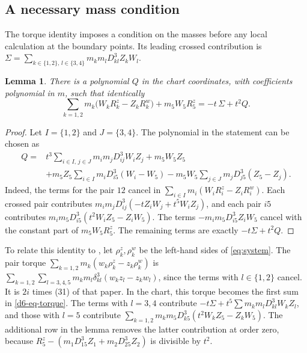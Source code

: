 \documentclass[Threeside,11pt]{article}
\newtheorem{lemma}[theorem]{Lemma}
\theoremstyle{definition}
\theoremstyle{remark}
\numberwithin{equation}{section}
\theoremstyle{remark}
\begin{document}
\subsection{A necessary mass condition}

{
The torque identity imposes a condition on the masses before any local
calculation at the boundary points.  Its leading crossed contribution is
$\Sigma=\sum_{k\in\{1,2\},\,l\in\{3,4\}}m_km_lD_{kl}^3Z_kW_l$.
}

{\begin{lemma}\label{d6-lem-torque}
There is a polynomial $Q$ in the chart coordinates, with coefficients polynomial in $m$, such
that identically
\begin{equation}\label{d6-eq-torque}
  \sum_{k=1,2}m_k\bigl(W_kR^z_k-Z_kR^w_k\bigr)+m_5W_5R^z_5=-t\,\Sigma+t^2Q.
\end{equation}
\end{lemma}}
{\begin{proof}
Let $I=\{1,2\}$ and $J=\{3,4\}$. The polynomial in the statement can be chosen as
\begin{align*}
Q={}&t^3\sum_{i\in I,\,j\in J}m_im_jD_{ij}^3W_iZ_j
 +m_5W_5Z_5\\
&+m_5Z_5\sum_{i\in I}m_iD_{i5}^3(W_i-W_5)
 -m_5W_5\sum_{j\in J}m_jD_{j5}^3(Z_5-Z_j).
\end{align*}
Indeed, the terms for the pair $12$ cancel in
$\sum_{i\in I}m_i(W_iR_i^z-Z_iR_i^w)$.
Each crossed pair contributes
$m_im_jD_{ij}^3(-tZ_iW_j+t^5W_iZ_j)$,
and each pair $i5$ contributes
$m_im_5D_{i5}^3(t^2W_iZ_5-Z_iW_5)$.
The terms $-m_im_5D_{i5}^3Z_iW_5$ cancel with the constant part of
$m_5W_5R_5^z$. The remaining terms are exactly $-t\Sigma+t^2Q$.
\end{proof}

}{
To relate this identity to \cite[\S8.6]{AK}, let $\rho^z_k,\rho^w_k$ be
the left-hand sides of \eqref{eq:system}.  The pair torque
$\sum_{k=1,2}m_k(w_k\rho^z_k-z_k\rho^w_k)$ is
$\sum_{k=1,2}\sum_{l=3,4,5}m_km_l\delta_{kl}^3(w_kz_l-z_kw_l)$,
since the terms with $l\in\{1,2\}$ cancel.  It is $2i$ times (31) of that paper.
In the chart, this torque becomes the first sum in \eqref{d6-eq-torque}.
The terms with $l=3,4$ contribute $-t\Sigma+t^5\sum m_km_lD_{kl}^3W_kZ_l$,
and those with $l=5$ contribute
$\sum_{k=1,2}m_km_5D_{k5}^3(t^2W_kZ_5-Z_kW_5)$.
The additional row in the lemma removes the latter contribution at order
zero, because $R^z_5-(m_1D_{15}^3Z_1+m_2D_{25}^3Z_2)$ is divisible by $t^2$.
}
\end{document}
